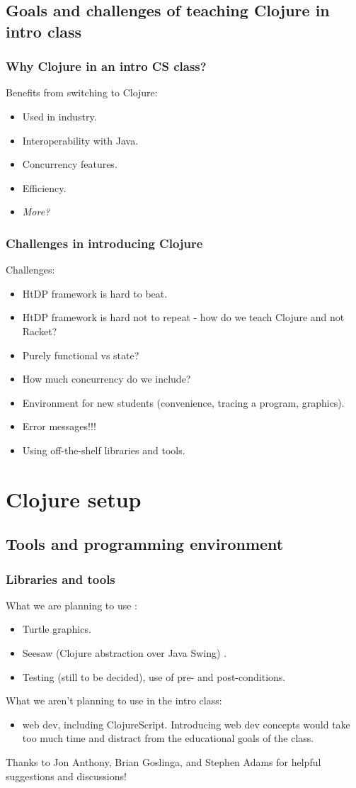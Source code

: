 \documentclass{beamer}
\begin{document}
\subsection{Goals and challenges of teaching Clojure in intro class}

\begin{frame}
  \frametitle{Why Clojure in an intro CS class?}
Benefits from switching to Clojure:
\begin{itemize}
\item Used in industry.
\item Interoperability with Java. 
\item Concurrency features. 
\item Efficiency.
\item {\it More?}
\end{itemize}
\end{frame}


\begin{frame}
  \frametitle{Challenges in introducing Clojure}
Challenges:
\begin{itemize}
\item HtDP framework is hard to beat.
\item HtDP framework is hard not to repeat - how do we teach Clojure and not Racket?
\item Purely functional vs state? 
\item How much concurrency do we include? 
\item Environment for new students (convenience, tracing a program, graphics).
\item Error messages!!!
\item Using off-the-shelf libraries and tools.
\end{itemize}
\end{frame}

\section{Clojure setup}

\subsection{Tools and programming environment}

\begin{frame}
  \frametitle{Libraries and tools}
What we are planning to use :
\begin{itemize}
\item Turtle graphics.
\item Seesaw (Clojure abstraction over Java Swing) .
\item Testing (still to be decided), use of pre- and post-conditions. 
\end{itemize}
What we aren't planning to use in the intro class:
\begin{itemize}
\item web dev, including ClojureScript. Introducing web dev concepts would take too much time and distract from the educational goals of the class. 
\end{itemize}
Thanks to Jon Anthony, Brian Goslinga, and Stephen Adams for helpful suggestions and discussions!
\end{frame}
\end{document}
